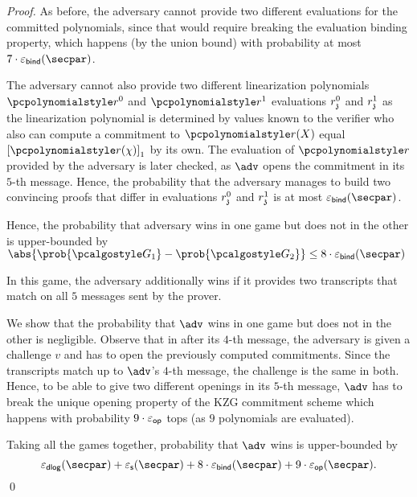 {\begin{proof}
As before, the adversary cannot provide two different evaluations for the
committed polynomials, since that would require breaking the evaluation
binding property, which happens (by the union bound) with probability at most
$7 \cdot \epsbind (\secpar)$. 

The adversary cannot also provide two different linearization polynomials
$\p{r^0}$ and $\p{r^1}$ evaluations $r^0_{\mathfrak{z}}$ and $r^1_{\mathfrak{z}}$ as the
linearization polynomial is determined by values known to the verifier who
also can compute a commitment to $\p{r}(X)$ equal $\gone{\p{r}(\chi)}$ by its
own. The evaluation of $\p{r}$ provided by the adversary is later checked, as
$\adv$ opens the commitment in its $5$-th message. Hence, the probability that the
adversary manages to build two convincing proofs that differ in evaluations
$r^0_{\mathfrak{z}}$ and $r^1_{\mathfrak{z}}$ is at most $\epsbind (\secpar)$.

Hence, the probability that adversary wins in one game but does not in the
other is upper-bounded by $\abs{\prob{\game{1}} - \prob{\game{2}}} \leq  8 \cdot \epsbind (\secpar)$

 In this game, the adversary additionally wins if it provides two transcripts that
match on all $5$ messages sent by the prover.

 We show that the probability that $\adv$
wins in one game but does not in the other is negligible.  Observe that in
after its $4$-th message, the adversary is given a challenge $v$ and has to open
the previously computed commitments. Since the transcripts match up to $\adv$'s 
$4$-th message, the challenge is the same in both. Hence, to be able to give two different
openings in its $5$-th message, $\adv$ has to break the unique opening property of the
KZG commitment scheme which happens with probability $9 \cdot \varepsilon_{\mathsf{op}}$ tops (as $9$
polynomials are evaluated).

 Taking all the games together, probability that $\adv$ wins
is upper-bounded by
\[
\epsdlog (\secpar) + \epss (\secpar) + 8 \cdot \epsbind (\secpar) + 9 \cdot \epsop (\secpar).
\]
\qed
	\end{proof}
}
